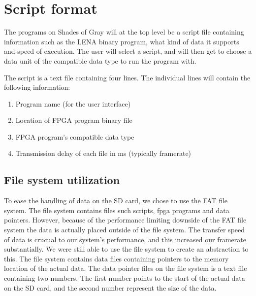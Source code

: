 \section{Script format}

The programs on { Shades of Gray} will at the top level be a script file containing information such as the LENA binary program, what kind of data it supports and speed of execution. The user will select a script, and will then get to choose a data unit of the compatible data type to run the program with.

The script is a text file containing four lines. The individual lines will contain the following information:

\begin{enumerate}
\item Program name (for the user interface)
\item Location of FPGA program binary file
\item FPGA program's compatible data type
\item Transmission delay of each file in ms (typically framerate)
\end{enumerate}

\subsection{File system utilization}
{
To ease the handling of data on the SD card, we chose to use the FAT file system. The file system contains files such scripts, fpga programs and data pointers. However, because of the performance limiting downside of the FAT file system the data is actually placed outside of the file system. The transfer speed of data is crucual to our system's performance, and this increased our framerate substantially. We were still able to use the file system to create an abstraction to this. The file system contains data files containing pointers to the memory location of the actual data. The data pointer files on the file system is a text file containing two numbers. The first number points to the start of the actual data on the SD card, and the second number represent the size of the data.
}


